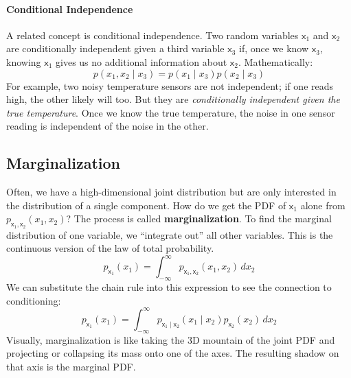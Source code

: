 \paragraph*{Conditional Independence}
A related concept is conditional independence. Two random variables $\mathsf{x}_1$ and $\mathsf{x}_2$ are conditionally independent given a third variable $\mathsf{x}_3$ if, once we know $\mathsf{x}_3$, knowing $\mathsf{x}_1$ gives us no additional information about $\mathsf{x}_2$. Mathematically:
\begin{equation}
    p(x_1, x_2 \mid x_3) = p(x_1 \mid x_3)p(x_2 \mid x_3)
\end{equation}
For example, two noisy temperature sensors are not independent; if one reads high, the other likely will too. But they are \textit{conditionally independent given the true temperature}. Once we know the true temperature, the noise in one sensor reading is independent of the noise in the other.

\subsection{Marginalization}
Often, we have a high-dimensional joint distribution but are only interested in the distribution of a single component. How do we get the PDF of $\mathsf{x}_1$ alone from $p_{\mathsf{x}_1, \mathsf{x}_2}(x_1, x_2)$? The process is called \textbf{marginalization}. To find the marginal distribution of one variable, we ``integrate out'' all other variables. This is the continuous version of the law of total probability.
\begin{equation}
    p_{\mathsf{x}_1}(x_1) = \int_{-\infty}^{\infty} p_{\mathsf{x}_1, \mathsf{x}_2}(x_1, x_2)\,dx_2
\end{equation}
We can substitute the chain rule into this expression to see the connection to conditioning:
\begin{equation}
    p_{\mathsf{x}_1}(x_1) = \int_{-\infty}^{\infty} p_{\mathsf{x}_1 \mid \mathsf{x}_2}(x_1 \mid x_2)p_{\mathsf{x}_2}(x_2)\,dx_2
\end{equation}
Visually, marginalization is like taking the 3D mountain of the joint PDF and projecting or collapsing its mass onto one of the axes. The resulting shadow on that axis is the marginal PDF.

